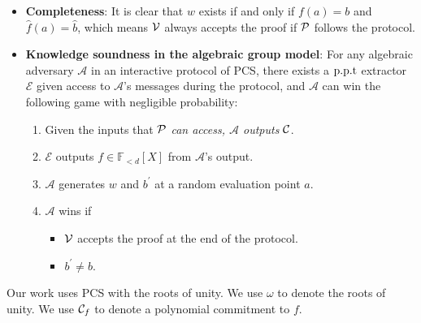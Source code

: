 \begin{definition}
\begin{enumerate}
\begin{enumerate}
    \end{enumerate}
\end{enumerate}
\begin{itemize}
    \item \textbf{Completeness}: It is clear that $w$ exists if and only if $f(a)=b$ and $\hat{f}(a)=\hat{b}$, which means $\mathcal{V}$ always accepts the proof if $\mathcal{P}$ follows the protocol.
    \item \textbf{Knowledge soundness in the algebraic group model}: For any algebraic adversary $\mathcal{A}$ in an interactive protocol of PCS, there exists a $\text{p.p.t}$ extractor $\mathcal{E}$ given access to $\mathcal{A}$'s messages during the protocol, and $\mathcal{A}$ can win the following game with negligible probability:
    \begin{enumerate}
        \item Given the inputs that $\mathcal{P}$ \textit{can access, $\mathcal{A}$ outputs} $\mathcal{C}$.
        \item $\mathcal{E}$ outputs $f\in\mathbb{F}_{<d}[X]$ from $\mathcal{A}$'s output.
        \item $\mathcal{A}$ generates $w$ and $b^\prime$ at a random evaluation point $a$.
        \item $\mathcal{A}$ wins if
        \begin{itemize}
            \item $\mathcal{V}$ accepts the proof at the end of the protocol.
            \item $b^\prime\ne{b}$.
        \end{itemize}
    \end{enumerate}
\end{itemize}
\end{definition}
Our work uses PCS with the roots of unity. We use $\omega$ to denote the roots of unity. We use $\mathcal{C}_f$ to denote a polynomial commitment to $f$.

